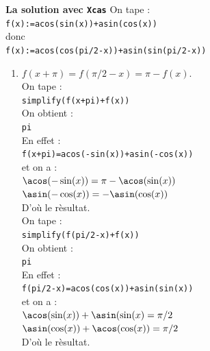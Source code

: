 \documentclass[a4paper,11pt]{book}
\begin{document}
{\bf La solution avec {\tt Xcas}}
On tape :\\
{\tt f(x):=acos(sin(x))+asin(cos(x))}\\
donc \\
{\tt f(x):=acos(cos(pi/2-x))+asin(sin(pi/2-x))}\\
\begin{enumerate}
\item $f(x+\pi)=f(\pi/2-x)=\pi-f(x)$.\\
On tape :\\
{\tt simplify(f(x+pi)+f(x))}\\
On obtient :\\
{\tt pi}\\
En effet :\\
{\tt f(x+pi)=acos(-sin(x))+asin(-cos(x))}\\
et on a : \\
$\acos(-\sin(x))=\pi-\acos(\sin(x))$\\
$\asin(-\cos(x))=-\asin(\cos(x))$\\
D'o\`u le r\`esultat.\\
On tape :\\
{\tt simplify(f(pi/2-x)+f(x))}\\
On obtient :\\
{\tt pi}\\
En effet :\\
{\tt f(pi/2-x)=acos(cos(x))+asin(sin(x))}\\
et on a : \\
$\acos(\sin(x))+\asin(\sin(x)=\pi/2$\\
$\asin(\cos(x))+\acos(\cos(x))=\pi/2$\\
D'o\`u le r\`esultat.


\end{enumerate}
\end{document}
